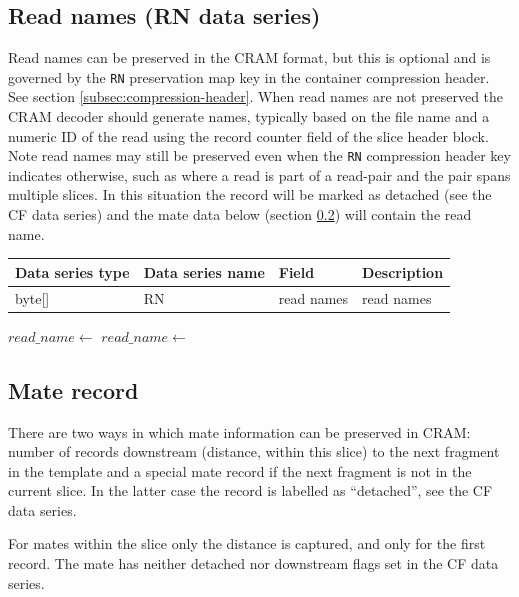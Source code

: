 \documentclass[a4paper]{article}
\begin{document}
\subsection{Read names (RN data series)}
\label{subsec:names}

Read names can be preserved in the CRAM format, but this is optional and is governed by the \texttt{RN} preservation map key in the container compression header. See section \ref{subsec:compression-header}.
When read names are not preserved the CRAM decoder should generate names, typically based on the file name and a numeric ID of the read using the record counter field of the slice header block.
Note read names may still be preserved even when the \texttt{RN} compression header key indicates otherwise, such as where a read is part of a read-pair and the pair spans multiple slices.
In this situation the record will be marked as detached (see the CF data series) and the mate data below (section \ref{subsec:mate}) will contain the read name.

\begin{tabular}{|>{\raggedright}p{70pt}|>{\raggedright}p{75pt}|>{\raggedright}p{90pt}|>{\raggedright}p{171pt}|}
\hline
\textbf{Data series type} & \textbf{Data series name} & \textbf{Field} & \textbf{Description}\tabularnewline
\hline
byte[] & RN & read names & read names\tabularnewline
\hline
\end{tabular}

\vskip 20pt
\begin{algorithmic}[1]
  \State $read\_name \gets$ 
\Else
  \State $read\_name \gets$ 
\EndIf
\Statex
\EndProcedure
\end{algorithmic}

\subsection{\textbf{Mate record}}
\label{subsec:mate}

There are two ways in which mate information can be preserved in CRAM: number of records downstream (distance, within this slice) to the next fragment in the template and a special mate record if the next fragment is not in the current slice.
In the latter case the record is labelled as ``detached'', see the CF data series.

For mates within the slice only the distance is captured, and only for the first record.  The mate has neither detached nor downstream flags set in the CF data series.
\end{document}
